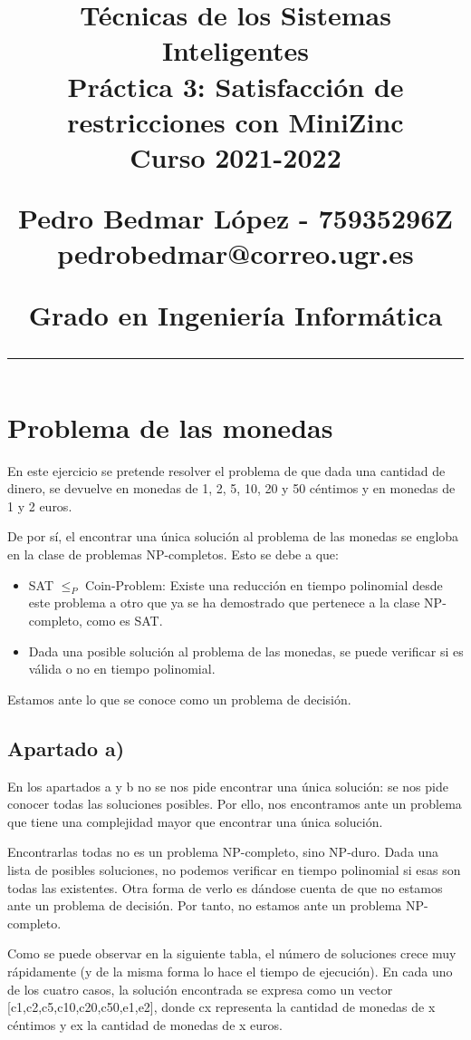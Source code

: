 \documentclass[12pt]{article} %
\title{	

\vspace{-2.5cm}
\LARGE \textbf{Técnicas de los Sistemas Inteligentes} \\
\LARGE Práctica 3: Satisfacción de restricciones con MiniZinc \\[0.5em]
\large Curso 2021-2022 \par
\large Pedro Bedmar López - 75935296Z \\
\normalsize pedrobedmar@correo.ugr.es \par
\large Grado en Ingeniería Informática
\vspace{-7pt}
\rule{\textwidth}{0.4pt}
\vspace{-2cm}
}
\date{}
\begin{document}
\clearpage
\maketitle %

\section{Problema de las monedas}
En este ejercicio se pretende resolver el problema de que dada una cantidad de dinero, se devuelve en monedas de 1, 2, 5, 10, 20 y 50 céntimos y en monedas de 1 y 2 euros.

De por sí, el encontrar una única solución al problema de las monedas se engloba en la clase de problemas NP-completos. Esto se debe a que:
\begin{itemize}
    \item SAT $\leq_P$ Coin-Problem: Existe una reducción en tiempo polinomial desde este problema a otro que ya se ha demostrado que pertenece a la clase NP-completo, como es SAT.
    \item Dada una posible solución al problema de las monedas, se puede verificar si es válida o no en tiempo polinomial.
\end{itemize}
Estamos ante lo que se conoce como un problema de decisión.

\subsection{Apartado a)}

En los apartados a y b no se nos pide encontrar una única solución: se nos pide conocer todas las soluciones posibles. Por ello, nos encontramos ante un problema que tiene una complejidad mayor que encontrar una única solución.

Encontrarlas todas no es un problema NP-completo, sino NP-duro. Dada una lista de posibles soluciones, no podemos verificar en tiempo polinomial si esas son todas las existentes. Otra forma de verlo es dándose cuenta de que no estamos ante un problema de decisión. Por tanto, no estamos ante un problema NP-completo.

Como se puede observar en la siguiente tabla, el número de soluciones crece muy rápidamente (y de la misma forma lo hace el tiempo de ejecución). En cada uno de los cuatro casos, la solución encontrada se expresa como un vector [c1,c2,c5,c10,c20,c50,e1,e2], donde cx representa la cantidad de monedas de x céntimos y ex la cantidad de monedas de x euros.
\end{document}
